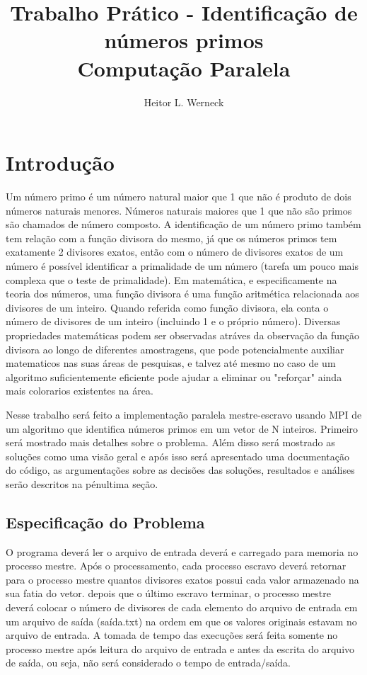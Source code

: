 \documentclass{article}
\title{Trabalho Prático - Identificação de números primos \\
	\large Computação Paralela}
\author{Heitor L. Werneck}
\begin{document}
\maketitle

\section{Introdução}

Um número primo é um número natural maior que 1 que não é produto de dois
números naturais menores. Números naturais maiores que 1 que não são primos são
chamados de número composto. A identificação de um número primo também tem
relação com a função divisora do mesmo, já que os números primos tem exatamente
2 divisores exatos, então com o número de divisores exatos de um número é
possível identificar a primalidade de um número (tarefa um pouco mais complexa
que o teste de primalidade). Em matemática, e especificamente na teoria dos
números, uma função divisora é uma função aritmética relacionada aos divisores
de um inteiro. Quando referida como função divisora, ela conta o número de
divisores de um inteiro (incluindo 1 e o próprio número). Diversas propriedades
matemáticas podem ser observadas atráves da observação da função divisora ao
longo de diferentes amostragens, que pode potencialmente auxiliar matematicos
nas suas áreas de pesquisas, e talvez até mesmo no caso de um algoritmo
suficientemente eficiente pode ajudar a eliminar ou "reforçar" ainda mais
colorarios existentes na área.

Nesse trabalho será feito a implementação paralela mestre-escravo usando MPI de um algoritmo que identifica números primos em um vetor de N inteiros. Primeiro será mostrado mais detalhes sobre o problema. Além disso será mostrado as soluções como uma visão geral e após isso será apresentado uma documentação do código, as argumentações sobre as decisões das soluções, resultados e análises serão descritos na pénultima seção.

\subsection{Especificação do Problema}
O programa deverá ler o arquivo de entrada deverá e carregado para memoria no
processo mestre. Após o processamento, cada processo escravo deverá retornar
para
o processo mestre quantos divisores exatos possui cada valor armazenado na
sua fatia do vetor. depois que o último escravo terminar, o processo mestre
deverá colocar o número de divisores de cada elemento do arquivo de entrada
em um arquivo de saída (saída.txt) na ordem em que os valores originais
estavam no arquivo de entrada. A tomada de tempo das execuções será
feita somente no processo mestre após leitura do arquivo de entrada e antes
da escrita do arquivo de saída, ou seja,
não será considerado o tempo de
entrada/saída.
\end{document}

